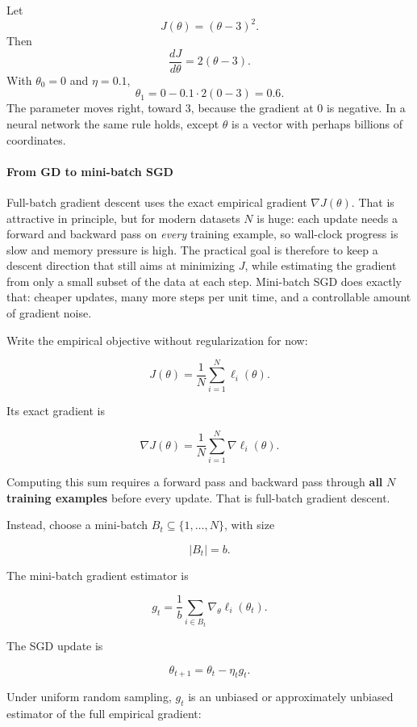 \documentclass[11pt,a4paper]{article}
\theoremstyle{definition}
\begin{document}
\begin{example}
Let
\[
J(\theta) = (\theta - 3)^2.
\]
Then
\[
\frac{dJ}{d\theta} = 2(\theta - 3).
\]
With $\theta_0 = 0$ and $\eta = 0.1$,
\[
\theta_1 = 0 - 0.1 \cdot 2(0 - 3) = 0.6.
\]
The parameter moves right, toward 3, because the gradient at 0 is negative. In a neural network the same rule holds, except $\theta$ is a vector with perhaps billions of coordinates.
\end{example}


\paragraph{From GD to mini-batch SGD}

Full-batch gradient descent uses the exact empirical gradient \(\nabla J(\theta)\). That is attractive in principle, but for modern datasets \(N\) is huge: each update needs a forward and backward pass on \emph{every} training example, so wall-clock progress is slow and memory pressure is high. The practical goal is therefore to keep a descent direction that still aims at minimizing \(J\), while estimating the gradient from only a small subset of the data at each step. Mini-batch SGD does exactly that: cheaper updates, many more steps per unit time, and a controllable amount of gradient noise.

Write the empirical objective without regularization for now:

\[
J(\theta) = \frac{1}{N} \sum_{i=1}^{N} \ell_i(\theta).
\]

Its exact gradient is

\[
\nabla J(\theta) = \frac{1}{N} \sum_{i=1}^{N} \nabla \ell_i(\theta).
\]

Computing this sum requires a forward pass and backward pass through \textbf{all} $N$ \textbf{training examples} before every update. That is full-batch gradient descent.

Instead, choose a mini-batch $B_t \subseteq \{1, \dots, N\}$, with size

\[
|B_t| = b.
\]

The mini-batch gradient estimator is

\[
g_t = \frac{1}{b} \sum_{i \in B_t} \nabla_\theta \ell_i(\theta_t).
\]

The SGD update is

\[
\boxed{\theta_{t+1} = \theta_t - \eta_t g_t.}
\]

Under uniform random sampling, $g_t$ is an unbiased or approximately unbiased estimator of the full empirical gradient:
\end{document}
